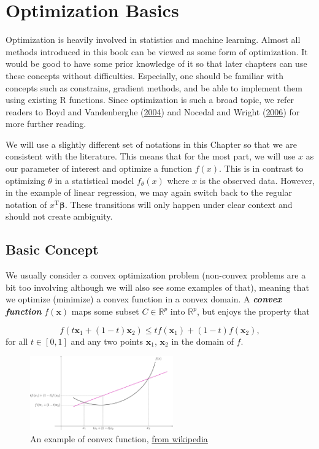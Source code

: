 \documentclass[
]{book}
\theoremstyle{definition}
\theoremstyle{definition}
\theoremstyle{definition}
\theoremstyle{definition}
\theoremstyle{remark}
\begin{document}
\hypertarget{optimization-basics}{%
\chapter{Optimization Basics}\label{optimization-basics}}

Optimization is heavily involved in statistics and machine learning. Almost all methods introduced in this book can be viewed as some form of optimization. It would be good to have some prior knowledge of it so that later chapters can use these concepts without difficulties. Especially, one should be familiar with concepts such as constrains, gradient methods, and be able to implement them using existing R functions. Since optimization is such a broad topic, we refer readers to Boyd and Vandenberghe (\protect\hyperlink{ref-boyd2004convex}{2004}) and Nocedal and Wright (\protect\hyperlink{ref-nocedal2006numerical}{2006}) for more further reading.

We will use a slightly different set of notations in this Chapter so that we are consistent with the literature. This means that for the most part, we will use \(x\) as our parameter of interest and optimize a function \(f(x)\). This is in contrast to optimizing \(\theta\) in a statistical model \(f_\theta(x)\) where \(x\) is the observed data. However, in the example of linear regression, we may again switch back to the regular notation of \(x^\text{T} \boldsymbol \beta\). These transitions will only happen under clear context and should not create ambiguity.

\hypertarget{basic-concept}{%
\section{Basic Concept}\label{basic-concept}}

We usually consider a convex optimization problem (non-convex problems are a bit too involving although we will also see some examples of that), meaning that we optimize (minimize) a convex function in a convex domain. A \textbf{\emph{convex function}} \(f(\mathbf{x})\) maps some subset \(C \in \mathbb{R}^p\) into \(\mathbb{R}^p\), but enjoys the property that

\[ f(t \mathbf{x}_1 + (1 - t) \mathbf{x}_2) \leq t f(\mathbf{x}_1) + ( 1- t) f(\mathbf{x}_2), \]
for all \(t \in [0, 1]\) and any two points \(\mathbf{x}_1\), \(\mathbf{x}_2\) in the domain of \(f\).

\begin{figure}
\centering
\includegraphics[width=0.55\textwidth,height=\textheight]{images/ConvexFunction.png}
\caption{An example of convex function, \href{https://en.wikipedia.org/wiki/Convex_function}{from wikipedia}}
\end{figure}
\end{document}
